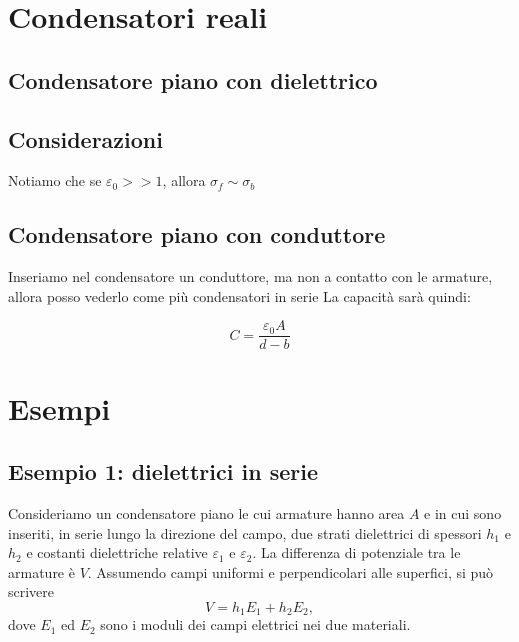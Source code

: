 \documentclass{book}
\begin{document}
\section{Condensatori reali}

\subsection{Condensatore piano con dielettrico}











\subsection{Considerazioni}




Notiamo che se $\varepsilon_0 >> 1$, allora $\sigma_f \sim \sigma_b$

\subsection{Condensatore piano con conduttore}
Inseriamo nel condensatore un conduttore, ma non a contatto con le armature, allora posso vederlo come più condensatori in serie
La capacità sarà quindi:


$$
C = \frac{\varepsilon_0 A}{d-b}
$$






\section{Esempi}

\subsection*{Esempio 1: dielettrici in serie}

Consideriamo un condensatore piano le cui armature hanno area \(A\) e in cui sono inseriti, in serie lungo la direzione del campo, due strati dielettrici di spessori \(h_1\) e \(h_2\) e costanti dielettriche relative \(\varepsilon_1\) e \(\varepsilon_2\). La differenza di potenziale tra le armature è \(V\). Assumendo campi uniformi e perpendicolari alle superfici, si può scrivere
\[
V = h_1 E_1 + h_2 E_2,
\]
dove \(E_1\) ed \(E_2\) sono i moduli dei campi elettrici nei due materiali.
\end{document}

